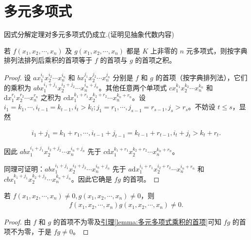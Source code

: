 \documentclass[../../main.tex]{subfiles}%
\begin{document}
\section{多元多项式}

因式分解定理对多元多项式仍成立.(证明见抽象代数内容)

\begin{lemma}\label{lemma:多元多项式乘积的首项}
若 $f(x_1, x_2, \cdots, x_n)$ 及 $g(x_1, x_2, \cdots, x_n)$ 都是 $K$ 上非零的 $n$ 元多项式，则按字典排列法排列后乘积的首项等于 $f$ 的首项与 $g$ 的首项之积。
\end{lemma}
\begin{proof}

设 $ax_1^{i_1} x_2^{i_2} \cdots x_n^{i_n}$ 和 $bx_1^{j_1} x_2^{j_2} \cdots x_n^{j_n}$ 分别是 $f$ 和 $g$ 的首项（按字典排列法），它们的乘积为 $abx_1^{i_1 + j_1} x_2^{i_2 + j_2} \cdots x_n^{i_n + j_n}$。其他任意两个单项式 $cx_1^{k_1} x_2^{k_2} \cdots x_n^{k_n}$ 和 $\mathrm{d}x_1^{r_1} x_2^{r_2} \cdots x_n^{r_n}$ 之积为 $c\mathrm{d}x_1^{k_1 + r_1} x_2^{k_2 + r_2} \cdots x_n^{k_n + r_n}$。设 $i_1 = k_1, \cdots, i_{t-1} = k_{t-1}, i_t > k_t; j_1 = r_1, \cdots, j_{s-1} = r_{s-1}, j_s > r_s$。不妨设 $t \leqslant  s$，显然

\begin{align*}
i_1 + j_1 = k_1 + r_1, \cdots, i_{t-1} + j_{t-1} = k_{t-1} + r_{t-1}, i_t + j_t > k_t + r_t.
\end{align*}

因此 $abx_1^{i_1 + j_1} x_2^{i_2 + j_2} \cdots x_n^{i_n + j_n}$ 先于 $c\mathrm{d}x_1^{k_1 + r_1} x_2^{k_2 + r_2} \cdots x_n^{k_n + r_n}$。

同理可证明：$abx_1^{i_1 + j_1} x_2^{i_2 + j_2} \cdots x_n^{i_n + j_n}$ 先于 $a\mathrm{d}x_1^{i_1 + r_1} x_2^{i_2 + r_2} \cdots x_n^{i_n + r_n}$ 和 $cbx_1^{k_1 + j_1} x_2^{k_2 + j_2} \cdots x_n^{k_n + j_n}$。因此它确是 $fg$ 的首项。

\end{proof}

\begin{proposition}[多元多项式的整性]\label{proposition:多元多项式的整性}
若 $f(x_1, x_2, \cdots, x_n) \neq 0, g(x_1, x_2, \cdots, x_n) \neq 0$，则
\begin{align*}
f(x_1, x_2, \cdots, x_n)g(x_1, x_2, \cdots, x_n) \neq 0.
\end{align*}
\end{proposition}
\begin{proof}

由 $f$ 和 $g$ 的首项不为零及\hyperref[lemma:多元多项式乘积的首项]{引理\ref{lemma:多元多项式乘积的首项}}可知 $fg$ 的首项不为零，于是 $fg \neq 0$。

\end{proof}
\end{document}

